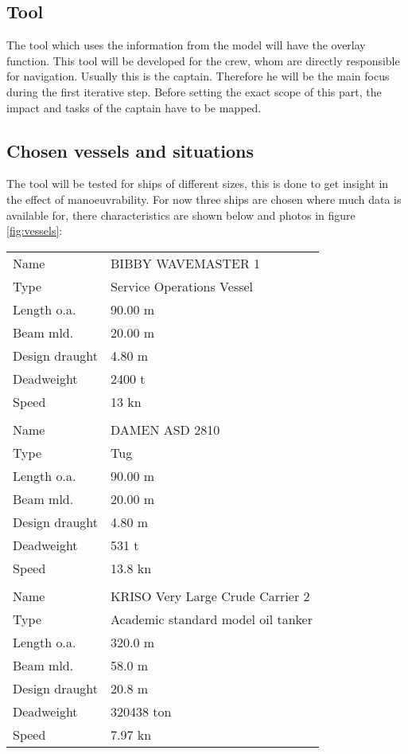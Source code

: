 \subsection{Tool}
The tool which uses the information from the model will have the overlay function. This tool will be developed for the crew, whom are directly responsible for navigation. Usually this is the captain. Therefore he will be the main focus during the first iterative step. Before setting the exact scope of this part, the impact and tasks of the captain have to be mapped.

\newpage
\subsection{Chosen vessels and situations}
The tool will be tested for ships of different sizes, this is done to get insight in the effect of manoeuvrability. For now three ships are chosen where much data is available for, there characteristics are shown below and photos in figure \ref{fig:vessels}:

\begin{tabular}[L]{l l}
	Name			& BIBBY WAVEMASTER 1 \\
	Type			& Service Operations Vessel \\
	Length o.a.		& 90.00 m \\
	Beam mld.		& 20.00 m \\
	Design draught	& 4.80 m \\
	Deadweight		& 2400 t \\
	Speed			& 13 kn \\
	& \\
	Name			& DAMEN ASD 2810 \\
	Type			& Tug \\
	Length o.a.		& 90.00	m \\
	Beam mld.		& 20.00	m \\
	Design draught	& 4.80 m \\
	Deadweight		& 531 t \\
	Speed			& 13.8 kn \\
	& \\
	Name			& KRISO Very Large Crude Carrier 2 \\
	Type			& Academic standard model oil tanker\\
	Length o.a.		& 320.0 m \\
	Beam mld.		& 58.0 m \\
	Design draught	& 20.8 m \\
	Deadweight		& 320438 ton \\
	Speed			& 7.97 kn \\
\end{tabular}

